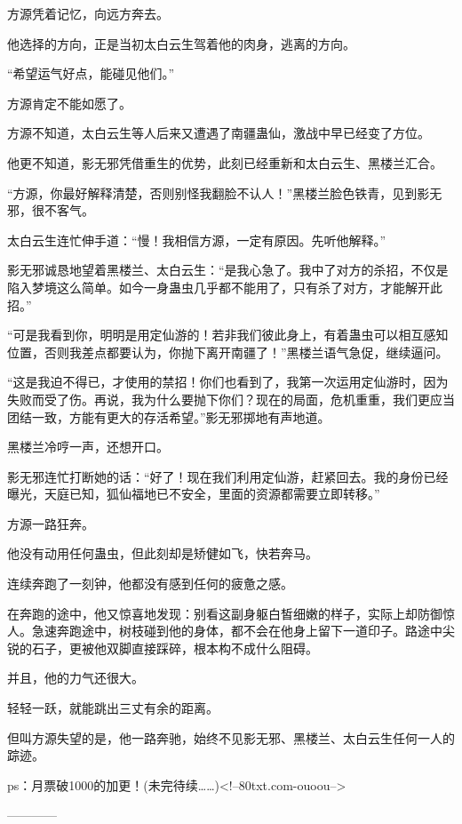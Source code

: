 \begin{this_body}
方源凭着记忆，向远方奔去。

他选择的方向，正是当初太白云生驾着他的肉身，逃离的方向。

“希望运气好点，能碰见他们。”

方源肯定不能如愿了。

方源不知道，太白云生等人后来又遭遇了南疆蛊仙，激战中早已经变了方位。

他更不知道，影无邪凭借重生的优势，此刻已经重新和太白云生、黑楼兰汇合。

“方源，你最好解释清楚，否则别怪我翻脸不认人！”黑楼兰脸色铁青，见到影无邪，很不客气。

太白云生连忙伸手道：“慢！我相信方源，一定有原因。先听他解释。”

影无邪诚恳地望着黑楼兰、太白云生：“是我心急了。我中了对方的杀招，不仅是陷入梦境这么简单。如今一身蛊虫几乎都不能用了，只有杀了对方，才能解开此招。”

“可是我看到你，明明是用定仙游的！若非我们彼此身上，有着蛊虫可以相互感知位置，否则我差点都要认为，你抛下离开南疆了！”黑楼兰语气急促，继续逼问。

“这是我迫不得已，才使用的禁招！你们也看到了，我第一次运用定仙游时，因为失败而受了伤。再说，我为什么要抛下你们？现在的局面，危机重重，我们更应当团结一致，方能有更大的存活希望。”影无邪掷地有声地道。

黑楼兰冷哼一声，还想开口。

影无邪连忙打断她的话：“好了！现在我们利用定仙游，赶紧回去。我的身份已经曝光，天庭已知，狐仙福地已不安全，里面的资源都需要立即转移。”

方源一路狂奔。

他没有动用任何蛊虫，但此刻却是矫健如飞，快若奔马。

连续奔跑了一刻钟，他都没有感到任何的疲惫之感。

在奔跑的途中，他又惊喜地发现：别看这副身躯白皙细嫩的样子，实际上却防御惊人。急速奔跑途中，树枝碰到他的身体，都不会在他身上留下一道印子。路途中尖锐的石子，更被他双脚直接踩碎，根本构不成什么阻碍。

并且，他的力气还很大。

轻轻一跃，就能跳出三丈有余的距离。

但叫方源失望的是，他一路奔驰，始终不见影无邪、黑楼兰、太白云生任何一人的踪迹。

ps：月票破1000的加更！(未完待续……)<!--80txt.com-ouoou-->

------------

\end{this_body}

